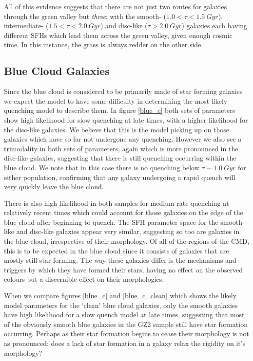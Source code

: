 \documentclass{mn2e}
\begin{document}
All of this evidence suggests that there are not just two routes for galaxies through the green valley but \emph{three}: with the smooth- ($1.0 < \tau < 1.5 ~Gyr$), intermediate- ($1.5 < \tau < 2.0~Gyr$) and disc-like ($\tau > 2.0~Gyr$) galaxies each having different SFHs which lead them across the green valley, given enough cosmic time. In this instance, the grass is always redder on the other side.


\subsection{Blue Cloud Galaxies}
Since the blue cloud is considered to be primarily made of star forming galaxies we expect the model to have some difficulty in determining the most likely quenching model to describe them. In figure \ref{blue_c} both sets of parameters show high likelihood for slow quenching at late times, with a higher likelihood for the disc-like galaxies. We believe that this is the model picking up on those galaxies which have so far not undergone any quenching. However we also see a trimodality in both sets of parameters, again which is more pronounced in the disc-like galaxies, suggesting that there is still quenching occurring within the blue cloud. We note that in this case there is no quenching below $\tau \sim 1.0~Gyr$ for either population, confirming that any galaxy undergoing a rapid quench will very quickly leave the blue cloud. 

There is also high likelihood in both samples for medium rate quenching at relatively recent times which could account for those galaxies on the edge of the blue cloud after beginning to quench. The SFH parameter space for the smooth-like and disc-like galaxies appear very similar, suggesting so too are galaxies in the blue cloud, irrespective of their morphology. Of all of the regions of the CMD, this is to be expected in the blue cloud since it consists of galaxies that are mostly still star forming. The way these galaxies differ is the mechanisms and triggers by which they have formed their stars, having no effect on the observed colours but a discernible effect on their morphologies.

When we compare figures \ref{blue_c} and \ref{blue_c_clean} which shows the likely model parameters for the `clean' blue cloud galaxies, only the smooth galaxies have high likelihood for a slow quench model at late times, suggesting that most of the obviously smooth blue galaxies in the GZ2 sample still have star formation occurring. Perhaps as their star formation begins to cease their morphology is not as pronounced; does a lack of star formation in a galaxy relax the rigidity on it's morphology?
\end{document}
